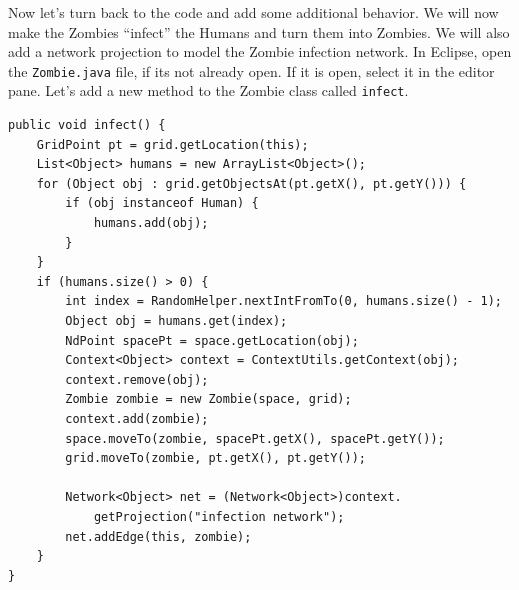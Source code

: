 \documentclass[11pt]{amsart}
\begin{document}
Now let's turn back to the code and add some additional behavior. We will now make the Zombies ``infect'' the Humans and turn them into Zombies. We will also add a network projection to model the Zombie infection network. In Eclipse, open the \texttt{Zombie.java} file, if its not already open. If it is open, select it in the editor pane. Let's add a new method to the Zombie class called \texttt{infect}. 

\noindent\begin{minipage}[h]{\textwidth}
\vspace{.2in}
\lstset{language=java,caption=Infect Method}
\begin{lstlisting}
public void infect() {
	GridPoint pt = grid.getLocation(this);
	List<Object> humans = new ArrayList<Object>();
	for (Object obj : grid.getObjectsAt(pt.getX(), pt.getY())) {
		if (obj instanceof Human) {
			humans.add(obj);
		}
	}
	if (humans.size() > 0) {
		int index = RandomHelper.nextIntFromTo(0, humans.size() - 1);
		Object obj = humans.get(index);
		NdPoint spacePt = space.getLocation(obj);
		Context<Object> context = ContextUtils.getContext(obj);
		context.remove(obj);
		Zombie zombie = new Zombie(space, grid);
		context.add(zombie);
		space.moveTo(zombie, spacePt.getX(), spacePt.getY());
		grid.moveTo(zombie, pt.getX(), pt.getY());
		
		Network<Object> net = (Network<Object>)context.
			getProjection("infection network");
		net.addEdge(this, zombie);
	}
}
\end{lstlisting}
\vspace{.2in}
\end{minipage}
\end{document}
